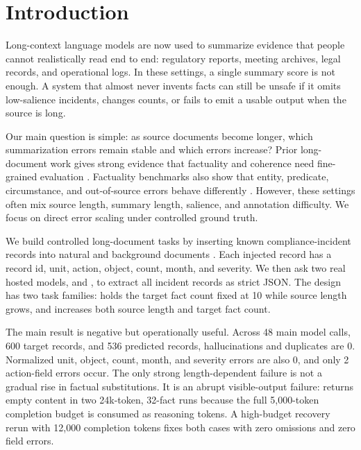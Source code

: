\section{Introduction}
\label{sec:introduction}

Long-context language models are now used to summarize evidence that people cannot realistically read end to end: regulatory reports, meeting archives, legal records, and operational logs. In these settings, a single summary score is not enough. A system that almost never invents facts can still be unsafe if it omits low-salience incidents, changes counts, or fails to emit a usable output when the source is long.

Our main question is simple: as source documents become longer, which summarization errors remain stable and which errors increase? Prior long-document work gives strong evidence that factuality and coherence need fine-grained evaluation \cite{chang2023booookscore,bishop2024longdocfactscore}. Factuality benchmarks also show that entity, predicate, circumstance, and out-of-source errors behave differently \cite{pagnoni2021frank,tang2023aggrefact}. However, these settings often mix source length, summary length, salience, and annotation difficulty. We focus on direct error scaling under controlled ground truth.

We build controlled long-document tasks by inserting known compliance-incident records into natural \qmsum and \govreport background documents \cite{zhong2021qmsum,huang2021govreport}. Each injected record has a record id, unit, action, object, count, month, and severity. We then ask two real hosted models, \gptfourmini and \gptfivemini, to extract all incident records as strict JSON. The design has two task families: \fixedload holds the target fact count fixed at 10 while source length grows, and \scaledload increases both source length and target fact count.

The main result is negative but operationally useful. Across 48 main model calls, 600 target records, and 536 predicted records, hallucinations and duplicates are 0. Normalized unit, object, count, month, and severity errors are also 0, and only 2 action-field errors occur. The only strong length-dependent failure is not a gradual rise in factual substitutions. It is an abrupt visible-output failure: \gptfivemini returns empty content in two 24k-token, 32-fact runs because the full 5,000-token completion budget is consumed as reasoning tokens. A high-budget recovery rerun with 12,000 completion tokens fixes both cases with zero omissions and zero field errors.

